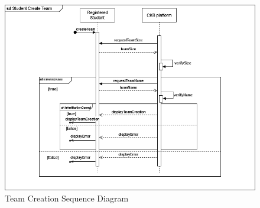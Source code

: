 \begin{center}
    \begin{figure} [H]
        \begin{center}
            \includegraphics[width=0.9\linewidth]{Images/SequenceDiagrams/SD_4.png}
            \caption{Team Creation Sequence Diagram}
            \label{fig: team_creation_seq_diag}
        \end{center}
    \end{figure}
\end{center}


